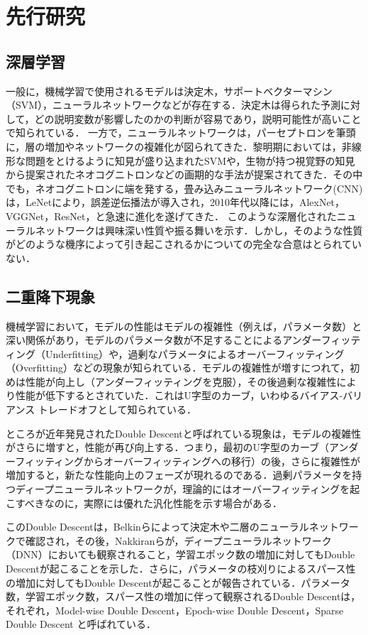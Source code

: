 \chapter{先行研究}
\section{深層学習}
一般に，機械学習で使用されるモデルは決定木，サポートベクターマシン（SVM），ニューラルネットワークなどが存在する．決定木は得られた予測に対して，どの説明変数が影響したのかの判断が容易であり，説明可能性が高いことで知られている．
一方で，ニューラルネットワークは，パーセプトロンを筆頭に，層の増加やネットワークの複雑化が図られてきた．黎明期においては，非線形な問題をとけるように知見が盛り込まれたSVMや，生物が持つ視覚野の知見から提案されたネオコグニトロンなどの画期的な手法が提案されてきた．その中でも，ネオコグニトロンに端を発する，畳み込みニューラルネットワーク(CNN)は，LeNet\cite{LeNet}により，誤差逆伝播法が導入され，2010年代以降には，AlexNet\cite{AlexNet}，VGGNet\cite{VGGNet}，ResNet\cite{ResNet}，と急速に進化を遂げてきた．
このような深層化されたニューラルネットワークは興味深い性質や振る舞いを示す．しかし，そのような性質がどのような機序によって引き起こされるかについての完全な合意はとられていない．

\section{二重降下現象}
機械学習において，モデルの性能はモデルの複雑性（例えば，パラメータ数）と深い関係があり，モデルのパラメータ数が不足することによるアンダーフィッティング（Underfitting）\cite{underfitting}や，過剰なパラメータによるオーバーフィッティング（Overfitting）\cite{overfitting}などの現象が知られている．モデルの複雑性が増すにつれて，初めは性能が向上し（アンダーフィッティングを克服），その後過剰な複雑性により性能が低下するとされていた．これはU字型のカーブ，いわゆるバイアス-バリアンス トレードオフ\cite{Rajnarayan2010}として知られている．

ところが近年発見されたDouble Descent\cite{Belkin_2019}と呼ばれている現象は，モデルの複雑性がさらに増すと，性能が再び向上する．つまり，最初のU字型のカーブ（アンダーフィッティングからオーバーフィッティングへの移行）の後，さらに複雑性が増加すると，新たな性能向上のフェーズが現れるのである．過剰パラメータを持つディープニューラルネットワークが，理論的にはオーバーフィッティングを起こすべきなのに，実際には優れた汎化性能を示す場合がある\cite{ResNet,ViT}．

このDouble Descentは，Belkinら\cite{Belkin_2019}によって決定木や二層のニューラルネットワークで確認され，その後，Nakkiranら\cite{nakkiran2021deep}が，ディープニューラルネットワーク（DNN）においても観察されること，学習エポック数の増加に対してもDouble Descentが起こることを示した．さらに，パラメータの枝刈りによるスパース性の増加に対してもDouble Descentが起こることが報告されている\cite{He}．パラメータ数，学習エポック数，スパース性の増加に伴って観察されるDouble Descentは，それぞれ，Model-wise Double Descent，Epoch-wise Double Descent，Sparse Double Descent と呼ばれている\cite{nakkiran2021deep,He}．

